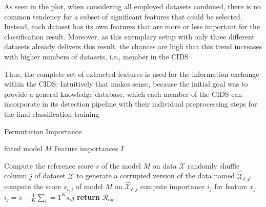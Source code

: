 \documentclass[../../main.tex]{subfiles}
\begin{document}
As seen in the plot, when considering all employed datasets combined, there is no common tendency for a subset of significant features that could be selected. Instead, each dataset has its own features that are more or less important for the classification result. Moreover, as this exemplary setup with only three different datasets already delivers this result, the chances are high that this trend increases with higher numbers of datasets, i.e., member in the CIDS

Thus, the complete set of extracted features is used for the information exchange within the CIDS; Intuitively that makes sense, because the initial goal was to provide a general knowledge database, which each member of the CIDS can incorporate in its detection pipeline with their individual preprocessing steps for the final classification training

\begin{algorithm}
    \caption{Permutation Importance}
    \label{alg:permutation_importance}
    \begin{algorithmic}[1]
        \REQUIRE fitted model $M$
        \ENSURE Feature importances $I$

        \STATE Compute the reference score $s$ of the model $M$ on data $\mathcal{X}$
                \STATE randomly shuffle column $j$ of dataset $\mathcal{X}$ to generate a corrupted version of the data named $\mathcal{\hat{X}_{i,j}}$
                \STATE compute the score $s_{i,j}$ of model $M$ on $\mathcal{\hat{X}_{i,j}}$
            \ENDFOR
            \STATE compute importance $i_j$ for feature $x_j$ $i_j = s - \frac{1}{K} \sum_i=1^K s_ij$
        \ENDFOR
        \STATE \textbf{return} $\mathcal{R}_{\text{out}}$
    \end{algorithmic}
 \end{algorithm}
\end{document}
